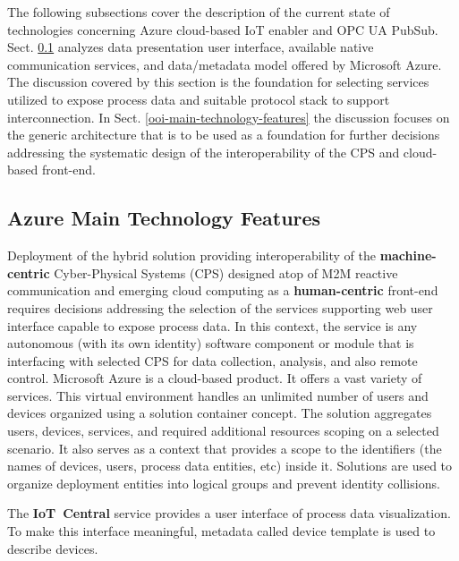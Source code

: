 \documentclass{article}
\begin{document}
The following subsections cover the description of the current state of technologies concerning Azure cloud-based IoT enabler and OPC UA PubSub. Sect. \ref{azure-main-technology-features} analyzes data presentation user interface, available native communication services, and data/metadata model offered by Microsoft Azure. The discussion covered by this section is the foundation for selecting services utilized to expose process data and suitable protocol stack to support interconnection. In Sect. \ref{ooi-main-technology-features} the discussion focuses on the generic architecture that is to be used as a foundation for further decisions addressing the systematic design of the interoperability of the CPS and cloud-based front-end.

\subsection{Azure Main Technology Features}\label{azure-main-technology-features}

Deployment of the hybrid solution providing interoperability of the \textbf{machine-centric} Cyber-Physical Systems (CPS) designed atop of M2M reactive communication and emerging cloud computing as a \textbf{human-centric} front-end requires decisions addressing the selection of the services supporting web user interface capable to expose process data. In this context, the service is any autonomous (with its own identity) software component or module that is interfacing with selected CPS for data collection, analysis, and also remote control. Microsoft Azure is a cloud-based product. It offers a vast variety of services. This virtual environment handles an unlimited number of users and devices organized using a solution container concept. The solution aggregates users, devices, services, and required additional resources scoping on a selected scenario. It also serves as a context that provides a scope to the identifiers (the names of devices, users, process data entities, etc) inside it. Solutions are used to organize deployment entities into logical groups and prevent identity collisions.

The \textbf{IoT\ Central} service provides a user interface of process data visualization. To make this interface meaningful, metadata called device template is used to describe devices.
\end{document}
